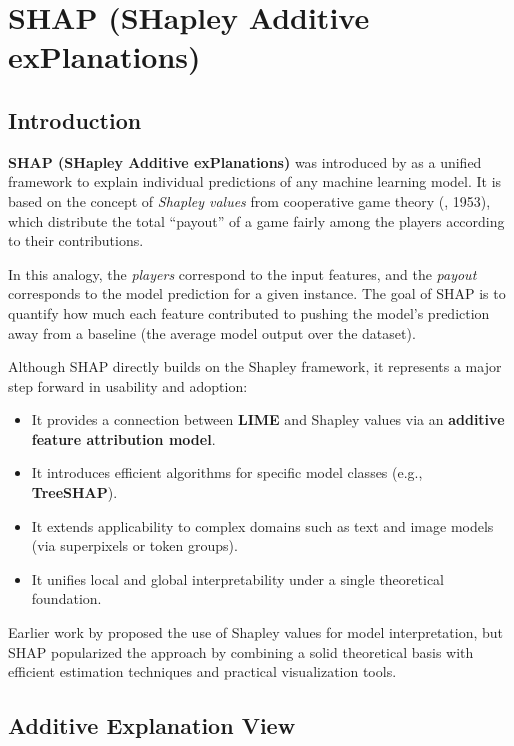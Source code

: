 \section{SHAP (SHapley Additive exPlanations)}

\subsection{Introduction}

\textbf{SHAP (SHapley Additive exPlanations)} was introduced by \citet{Lundberg2017SHAP} as a unified framework to explain individual predictions of any machine learning model.  
It is based on the concept of \textit{Shapley values} from cooperative game theory (\citeauthor{Shapley1953Value}, 1953), which distribute the total “payout” of a game fairly among the players according to their contributions.

In this analogy, the \textit{players} correspond to the input features, and the \textit{payout} corresponds to the model prediction for a given instance.  
The goal of SHAP is to quantify how much each feature contributed to pushing the model’s prediction away from a baseline (the average model output over the dataset).

Although SHAP directly builds on the Shapley framework, it represents a major step forward in usability and adoption:
\begin{itemize}
    \item It provides a connection between \textbf{LIME} and Shapley values via an \textbf{additive feature attribution model}.
    \item It introduces efficient algorithms for specific model classes (e.g., \textbf{TreeSHAP}).
    \item It extends applicability to complex domains such as text and image models (via superpixels or token groups).
    \item It unifies local and global interpretability under a single theoretical foundation.
\end{itemize}

Earlier work by \citet{Strumbelj2011Explaining, Strumbelj2014Explaining} proposed the use of Shapley values for model interpretation, but SHAP popularized the approach by combining a solid theoretical basis with efficient estimation techniques and practical visualization tools.

\subsection{Additive Explanation View}

